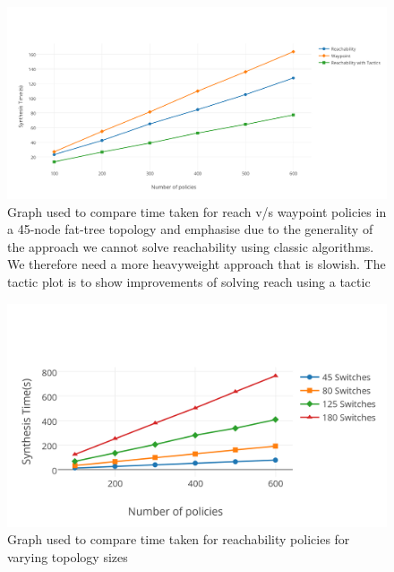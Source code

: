 %	
\begin{figure}
	\includegraphics[width=\columnwidth]{figures/reach-way-tactic.png}
	\caption{Graph used to compare time taken for reach v/s waypoint policies in a 45-node fat-tree topology and emphasise due to the generality of the approach we cannot solve reachability using classic algorithms. We therefore need a more heavyweight approach that is slowish. The tactic plot is to show improvements of solving reach using a tactic}
	\label{fig:reach-way-tactic}
\end{figure}
\begin{figure}
	\includegraphics[width=\columnwidth]{figures/reach-topo.png}
	\caption{Graph used to compare time taken for reachability policies for varying topology sizes}
	\label{fig:reach-topo}
\end{figure}


